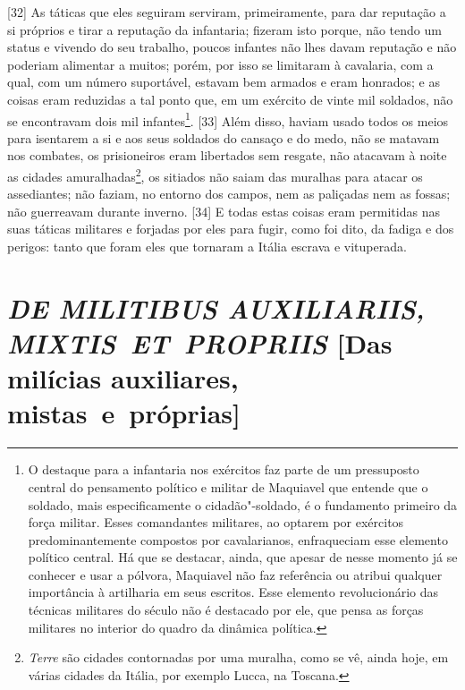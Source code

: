 {[}32{]} As táticas que eles seguiram serviram, primeiramente, para dar
reputação a si próprios e tirar a reputação da infantaria; fizeram isto
porque, não tendo um status e vivendo do seu trabalho, poucos infantes
não lhes davam reputação e não poderiam alimentar a muitos; porém, por
isso se limitaram à cavalaria, com a qual, com um número suportável,
estavam bem armados e eram honrados; e as coisas eram reduzidas a tal
ponto que, em um exército de vinte mil soldados, não se encontravam dois
mil infantes\footnote{O destaque para a infantaria nos exércitos faz
  parte de um pressuposto central do pensamento político e militar de
  Maquiavel que entende que o soldado, mais especificamente o
  cidadão"-soldado, é o fundamento primeiro da força militar. Esses
  comandantes militares, ao optarem por exércitos predominantemente
  compostos por cavalarianos, enfraqueciam esse elemento político
  central. Há que se destacar, ainda, que apesar de nesse momento já se
  conhecer e usar a pólvora, Maquiavel não faz referência ou atribui
  qualquer importância à artilharia em seus escritos. Esse elemento
  revolucionário das técnicas militares do século  não é destacado
  por ele, que pensa as forças militares no interior do quadro da
  dinâmica política.}. {[}33{]} Além disso, haviam usado todos os meios
para isentarem a si e aos seus soldados do cansaço e do medo, não se
matavam nos combates, os prisioneiros eram libertados sem resgate, não
atacavam à noite as cidades amuralhadas\footnote{\emph{Terre} são
  cidades contornadas por uma muralha, como se vê, ainda hoje, em várias
  cidades da Itália, por exemplo Lucca, na Toscana.}, os sitiados não
saiam das muralhas para atacar os assediantes; não faziam, no entorno
dos campos, nem as paliçadas nem as fossas; não guerreavam durante
inverno. {[}34{]} E todas estas coisas eram permitidas nas suas táticas
militares e forjadas por eles para fugir, como foi dito, da fadiga e dos
perigos: tanto que foram eles que tornaram a Itália escrava e vituperada.

\quebra\section{\emph{DE MILITIBUS AUXILIARIIS, MIXTIS~ET~PROPRIIS}\break
{[}Das milícias auxiliares, mistas~e~próprias{]}}

